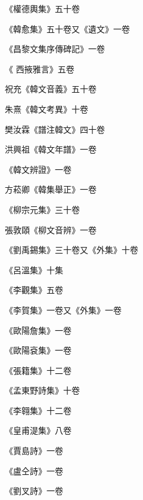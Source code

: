 \begin{pinyinscope}
 《權德輿集》五十卷



 《韓愈集》五十卷又《遺文》一卷



 《昌黎文集序傳碑記》一卷



 《
 西掖雅言》五卷



 祝充《韓文音義》五十卷



 朱熹《韓文考異》十卷



 樊汝霖《譜注韓文》四十卷



 洪興祖《韓文年譜》一卷



 《韓文辨證》一卷



 方菘卿《韓集舉正》一卷



 《柳宗元集》三十卷



 張敦頤《柳文音辨》一卷



 《劉禹錫集》三十卷又《外集》十卷



 《呂溫集》十集



 《李觀集》五卷



 《李賀集》一卷又《外集》一卷



 《歐陽詹集》一卷



 《歐陽袞集》一卷



 《張籍集》十二卷



 《孟東野詩集》十卷



 《李翱集》十二卷



 《皇甫湜集》八卷



 《賈島詩》一卷



 《盧仝詩》一卷



 《劉叉詩》一卷




\end{pinyinscope}
